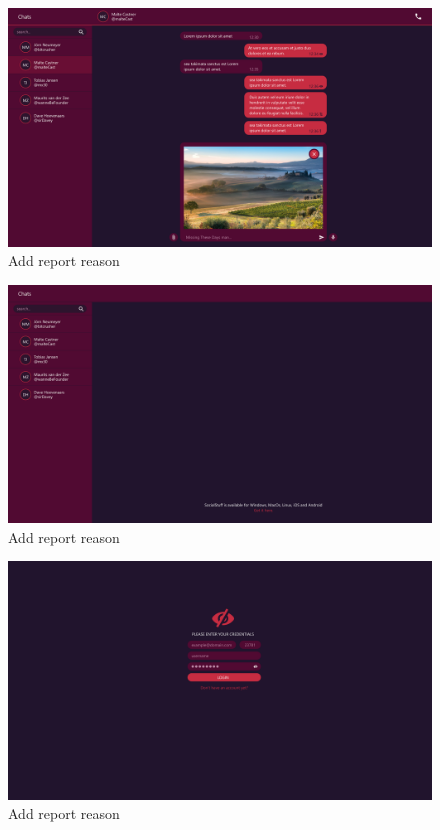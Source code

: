 \begin{figure}[h]
    \centering
    \includegraphics[width=1.0\textwidth]{./graphics/wireframes/ImageSent}
    \caption{Add report reason}
    \label{fig:figure21}
\end{figure}

\begin{figure}[h]
    \centering
    \includegraphics[width=1.0\textwidth]{./graphics/wireframes/LandingPage}
    \caption{Add report reason}
    \label{fig:figure22}
\end{figure}

\begin{figure}[h]
    \centering
    \includegraphics[width=1.0\textwidth]{./graphics/wireframes/Login}
    \caption{Add report reason}
    \label{fig:figure23}
\end{figure}

